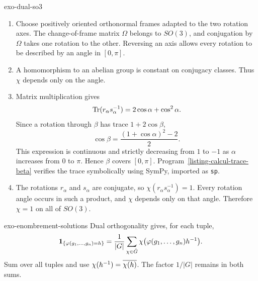 \begin{correction}{exo-dual-so3}
\begin{enumerate}
\item Choose positively oriented orthonormal frames adapted to the two
rotation axes. The change-of-frame matrix $\Omega$ belongs to $SO(3)$, and
conjugation by $\Omega$ takes one rotation to the other. Reversing an axis
allows every rotation to be described by an angle in $[0,\pi]$.
\item A homomorphism to an abelian group is constant on conjugacy classes.
Thus $\chi$ depends only on the angle.
\item Matrix multiplication gives
\[
 \operatorname{Tr}(r_\alpha s_\alpha^{-1})=2\cos\alpha+\cos^2\alpha.
\]
Since a rotation through $\beta$ has trace $1+2\cos\beta$,
\[
 \cos\beta=\frac{(1+\cos\alpha)^2-2}{2}.
\]
This expression is continuous and strictly decreasing from $1$ to $-1$ as
$\alpha$ increases from $0$ to $\pi$. Hence $\beta$ covers $[0,\pi]$.
Program~\ref{listing-calcul-trace-beta} verifies the trace symbolically using
SymPy, imported as \texttt{sp}.
\begin{listing}[H]
\caption{Symbolic trace of a product of rotations.}
\label{listing-calcul-trace-beta}
\end{listing}
\item The rotations $r_\alpha$ and $s_\alpha$ are conjugate, so
$\chi(r_\alpha s_\alpha^{-1})=1$. Every rotation angle occurs in such a product,
and $\chi$ depends only on that angle. Therefore $\chi=1$ on all of $SO(3)$.
\end{enumerate}
\end{correction}

\begin{correction}{exo-enombrement-solutions}
Dual orthogonality gives, for each tuple,
\[
 \mathbf{1}_{\{\varphi(g_1,\ldots,g_n)=h\}}
 =\frac1{|G|}\sum_{\chi\in\hat{G}}
   \chi\big(\varphi(g_1,\ldots,g_n)h^{-1}\big).
\]
Sum over all tuples and use $\chi(h^{-1})=\overline{\chi(h)}$.
The factor $1/|G|$ remains in both sums.
\end{correction}

